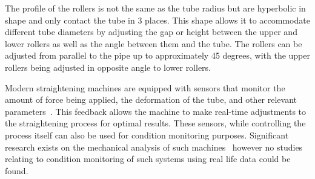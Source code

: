 \documentclass[]{article}
\begin{document}
The profile of the rollers is not the same as the tube radius but are hyperbolic in shape and only contact the tube in 3 places. This shape allows it to accommodate different tube diameters by adjusting the gap or height between the upper and lower rollers as well as the angle between them and the tube. The rollers can be adjusted from parallel to the pipe up to approximately 45 degrees, with the upper rollers being adjusted in opposite angle to lower rollers.

Modern straightening machines are equipped with sensors that monitor the amount of force being applied, the deformation of the tube, and other relevant parameters~\cite{zhang2010study}. This feedback allows the machine to make real-time adjustments to the straightening process for optimal results. These sensors, while controlling the process itself can also be used for condition monitoring purposes. Significant research exists on the mechanical analysis of such machines~\cite{kato2014straightening, ma2020effect, ma2021analysis, yu2018theoretical, das1991mechanics, yoshimura2009effect, zhang2019modeling} however no studies relating to condition monitoring of such systems using real life data could be found.
\end{document}
